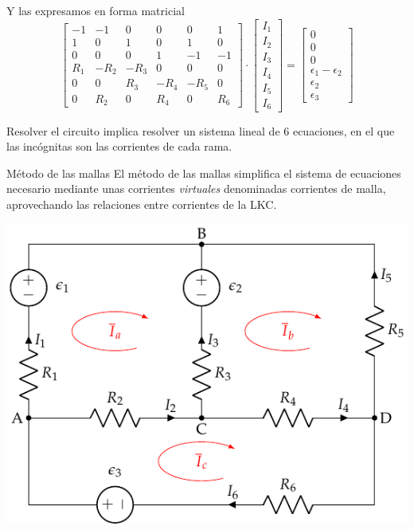 \documentclass[xcolor={usenames,svgnames,dvipsnames}]{beamer}
\begin{document}
\begin{frame}[label={sec:org33d4e79}]{Y las expresamos en forma matricial}
\begin{equation*}
  \begin{bmatrix}
    -1 & -1 & 0 & 0 & 0 & 1\\
    1 & 0 & 1 & 0 & 1 & 0\\
    0 & 0 & 0 & 1 & -1 & -1\\
    R_1 & -R_2 & - R_3 & 0 & 0 & 0\\
    0 & 0 & R_3 & - R_4 & - R_5 & 0\\
    0 & R_2 & 0 & R_4 & 0 & R_6
  \end{bmatrix} \cdot %
  \begin{bmatrix}
    I_1\\
    I_2\\
    I_3\\
    I_4\\
    I_5\\
    I_6    
  \end{bmatrix} = %
  \begin{bmatrix}
    0\\
    0\\
    0\\
    \epsilon_1 - \epsilon_2\\
    \epsilon_2\\
    \epsilon_3
  \end{bmatrix}
\end{equation*}

Resolver el circuito implica resolver un sistema lineal de 6 ecuaciones, en el que las incógnitas son las corrientes de cada rama.
\end{frame}
\begin{frame}[label={sec:org8bac076}]{Método de las mallas}
El método de las mallas simplifica el sistema de ecuaciones necesario mediante unas corrientes \emph{virtuales} denominadas \alert{corrientes de malla}, aprovechando las relaciones entre corrientes de la LKC.

\begin{center}
\includegraphics[height=0.7\textheight]{figs/mallas1_corrientes.pdf}
\end{center}
\end{frame}
\end{document}
